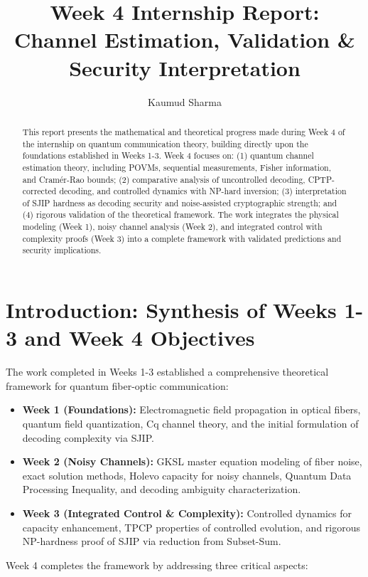 \documentclass[12pt]{article}
\title{Week 4 Internship Report:\\Channel Estimation, Validation \& Security Interpretation}
\author{Kaumud Sharma}
\date{}
\begin{document}
\maketitle

\begin{abstract}
This report presents the mathematical and theoretical progress made during Week 4 of the internship on quantum communication theory, building directly upon the foundations established in Weeks 1-3. Week 4 focuses on: (1) quantum channel estimation theory, including POVMs, sequential measurements, Fisher information, and Cram\'er-Rao bounds; (2) comparative analysis of uncontrolled decoding, CPTP-corrected decoding, and controlled dynamics with NP-hard inversion; (3) interpretation of SJIP hardness as decoding security and noise-assisted cryptographic strength; and (4) rigorous validation of the theoretical framework. The work integrates the physical modeling (Week 1), noisy channel analysis (Week 2), and integrated control with complexity proofs (Week 3) into a complete framework with validated predictions and security implications.
\end{abstract}

\tableofcontents
\newpage
\section{Introduction: Synthesis of Weeks 1-3 and Week 4 Objectives}

The work completed in Weeks 1-3 established a comprehensive theoretical framework for quantum fiber-optic communication:

\begin{itemize}
    \item \textbf{Week 1 (Foundations):} Electromagnetic field propagation in optical fibers, quantum field quantization, Cq channel theory, and the initial formulation of decoding complexity via SJIP.
    \item \textbf{Week 2 (Noisy Channels):} GKSL master equation modeling of fiber noise, exact solution methods, Holevo capacity for noisy channels, Quantum Data Processing Inequality, and decoding ambiguity characterization.
    \item \textbf{Week 3 (Integrated Control \& Complexity):} Controlled dynamics for capacity enhancement, TPCP properties of controlled evolution, and rigorous NP-hardness proof of SJIP via reduction from Subset-Sum.
\end{itemize}

Week 4 completes the framework by addressing three critical aspects:
\end{document}
